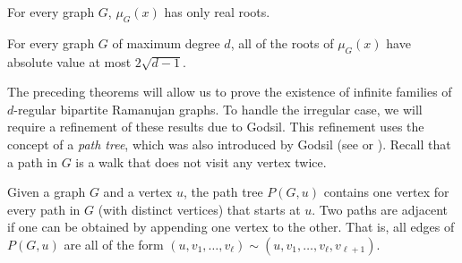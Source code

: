 \documentclass[11pt]{article}
\newcommand{\nikhil}[1]{{\bf \color{green} Nikhil: #1}}
\begin{document}
\begin{theorem}\label{thm:matchingReal}
For every graph $G$, $\mu_{G} (x)$ has only real roots.
\end{theorem}

\begin{theorem}\label{thm:matchingBound}
For every graph $G$ of maximum degree $d$, all of the roots of $\mu_{G} (x)$
  have absolute value at most $2 \sqrt{d-1}$.
\end{theorem}

The preceding theorems will allow us to prove the existence of infinite families of
  $d$-regular bipartite Ramanujan graphs.
To handle the irregular case, we will require a refinement of these results due to Godsil.
This refinement uses the concept of
  a {\em path tree}, which was also introduced by Godsil (see  \cite{Godsil} or
  \cite[Section 6]{GodsilBook}).
Recall that a path in $G$ is a walk that does not visit any vertex twice.

\begin{definition}\label{def:pathtree} Given a graph $G$ and a vertex $u$,
  the path tree $P (G,u)$ contains one vertex for every path in $G$ 
  (with distinct vertices)
  that starts at $u$.
Two paths are adjacent if one can be
  obtained by appending one vertex to the other.
That is,
 all edges of $P(G,u)$ are all of the form $(u,v_1,\ldots,
  v_\ell)\sim(u,v_1,\ldots,v_\ell,v_{\ell+1})$.
\end{definition}
\end{document}
